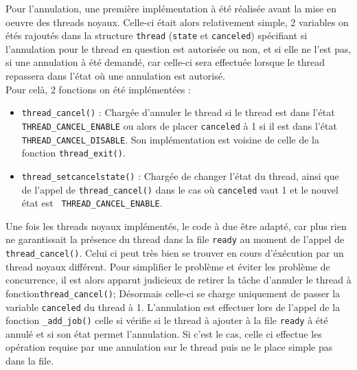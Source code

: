 Pour l'annulation, une première implémentation à été réalisée avant la mise en oeuvre des threads noyaux. Celle-ci était alors relativement simple, 2 variables on étés rajoutés dans la structure \verb!thread! (\verb!state! et \verb!canceled!) spécifiant si l'annulation pour le thread en question est autorisée ou non, et si elle ne l'est pas, si une annulation à été demandé, car celle-ci sera effectuée lorsque le thread repassera dans l'état où une annulation est autorisé.\\

Pour celà, 2 fonctions on été implémentées :
\begin{itemize}
\item \verb!thread_cancel()! : Chargée d'annuler le thread si le thread est dans l'état\\ \verb!THREAD_CANCEL_ENABLE! ou alors de placer \verb!canceled! à 1 si il est dans l'état \verb!THREAD_CANCEL_DISABLE!. Son implémentation est voisine de celle de la fonction \verb!thread_exit()!.\\
\item \verb!thread_setcancelstate()! : Chargée de changer l'état du thread, ainsi que de l'appel de \verb!thread_cancel()! dans le cas où \verb!canceled! vaut 1 et le nouvel état est \verb! THREAD_CANCEL_ENABLE!.
\end{itemize}

Une fois les threads noyaux implémentés, le code à due être adapté, car plus rien ne garantissait la présence du thread dans la file \verb!ready! au moment de l'appel de \verb!thread_cancel()!. Celui ci peut très bien se trouver en cours d'éxécution par un thread noyaux différent. Pour simplifier le problème et éviter les problème de concurrence, il est alors apparut judicieux de retirer la tâche d'annuler le thread à fonction\verb!thread_cancel()!; Désormais celle-ci se charge uniquement de passer la variable \verb!canceled! du thread à 1. L'annulation est effectuer lors de l'appel de la fonction \verb!_add_job()! celle si vérifie si le thread à ajouter à la file \verb!ready! à été annulé et si son état permet l'annulation. Si c'est le cas, celle ci effectue les opération requise par une annulation sur le thread puis ne le place simple pas dans la file.
